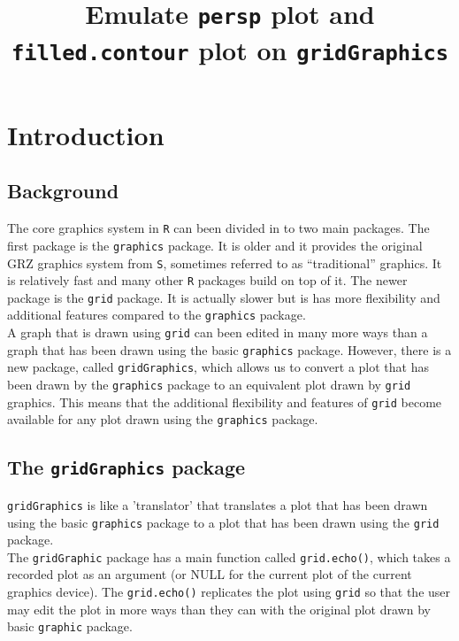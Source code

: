 \documentclass[paper=a4, fontsize=11pt]{report}
\begin{document}

\setlength{\parindent}{0}
\noindent

\title{Emulate \texttt{persp} plot and \texttt{filled.contour} plot on \texttt{gridGraphics}}
\maketitle
\chapter{Introduction}
\section{Background}
The core graphics system in \texttt{R} can been divided in to two main packages. The first package is the \texttt{graphics} package. It is older and it provides the original GRZ graphics system from \texttt{S}, sometimes referred to as ``traditional'' graphics. It is relatively fast and many other \texttt{R} packages build on top of it. The newer package is the \texttt{grid} package. It is actually slower but is has more flexibility and additional features compared to the \texttt{graphics} package. \\

A graph that is drawn using \texttt{grid} can been edited in many more ways than a graph that has been drawn using the basic \texttt{graphics} package. However, there is a new package, called \texttt{gridGraphics}, which allows us to convert a plot that has been drawn by the \texttt{graphics} package to an equivalent plot drawn by \texttt{grid} graphics. This means that the additional flexibility and features of \texttt{grid} become available for any plot drawn using the \texttt{graphics} package. \\

\section{The \texttt{gridGraphics} package}
\texttt{gridGraphics} is like a 'translator' that translates a plot that has been drawn using the basic \texttt{graphics} package to a plot that has been drawn using the \texttt{grid} package. \\

The \texttt{gridGraphic} package has a main function called \texttt{grid.echo()}, which takes a recorded plot as an argument (or NULL for the current plot of the current graphics device). The \texttt{grid.echo()} replicates the plot using \texttt{grid} so that the user may edit the plot in more ways than they can with the original plot drawn by basic \texttt{graphic} package.\\
\end{document}
